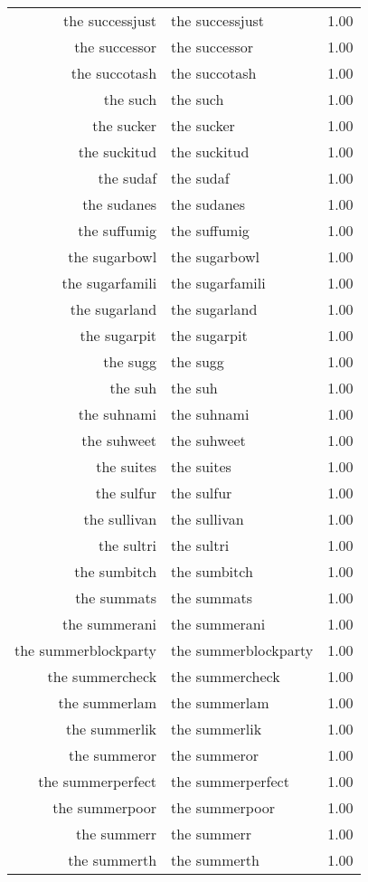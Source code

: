 \begin{table}[ht]
\begin{tabular}{rlr}
  the successjust & the successjust & 1.00 \\ 
  the successor & the successor & 1.00 \\ 
  the succotash & the succotash & 1.00 \\ 
  the such & the such & 1.00 \\ 
  the sucker & the sucker & 1.00 \\ 
  the suckitud & the suckitud & 1.00 \\ 
  the sudaf & the sudaf & 1.00 \\ 
  the sudanes & the sudanes & 1.00 \\ 
  the suffumig & the suffumig & 1.00 \\ 
  the sugarbowl & the sugarbowl & 1.00 \\ 
  the sugarfamili & the sugarfamili & 1.00 \\ 
  the sugarland & the sugarland & 1.00 \\ 
  the sugarpit & the sugarpit & 1.00 \\ 
  the sugg & the sugg & 1.00 \\ 
  the suh & the suh & 1.00 \\ 
  the suhnami & the suhnami & 1.00 \\ 
  the suhweet & the suhweet & 1.00 \\ 
  the suites & the suites & 1.00 \\ 
  the sulfur & the sulfur & 1.00 \\ 
  the sullivan & the sullivan & 1.00 \\ 
  the sultri & the sultri & 1.00 \\ 
  the sumbitch & the sumbitch & 1.00 \\ 
  the summats & the summats & 1.00 \\ 
  the summerani & the summerani & 1.00 \\ 
  the summerblockparty & the summerblockparty & 1.00 \\ 
  the summercheck & the summercheck & 1.00 \\ 
  the summerlam & the summerlam & 1.00 \\ 
  the summerlik & the summerlik & 1.00 \\ 
  the summeror & the summeror & 1.00 \\ 
  the summerperfect & the summerperfect & 1.00 \\ 
  the summerpoor & the summerpoor & 1.00 \\ 
  the summerr & the summerr & 1.00 \\ 
  the summerth & the summerth & 1.00 \\ 

\end{tabular}
\end{table}
